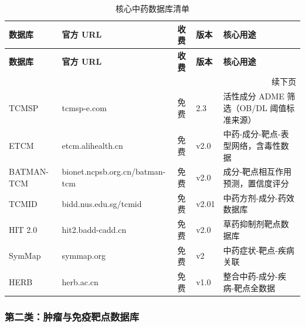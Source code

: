 \documentclass[12pt,a4paper,twoside]{article}
\begin{document}
\begin{longtable}{p{3cm}p{3.5cm}p{2cm}p{2cm}p{4cm}}
\caption{核心中药数据库清单} \label{tab:tcm_databases} \\
\toprule
\textbf{数据库} & \textbf{官方 URL} & \textbf{收费} & \textbf{版本} & \textbf{核心用途} \\
\midrule
\endfirsthead
\toprule
\textbf{数据库} & \textbf{官方 URL} & \textbf{收费} & \textbf{版本} & \textbf{核心用途} \\
\midrule
\endhead
\midrule
\multicolumn{5}{r}{\small 续下页} \\
\endfoot
\bottomrule
\endlastfoot
TCMSP & tcmsp-e.com & 免费 & 2.3 & 活性成分 ADME 筛选（OB/DL 阈值标准来源）\cite{ru2014tcmsp} \\
\addlinespace
ETCM & etcm.alihealth.cn & 免费 & v2.0 & 中药-成分-靶点-表型网络，含毒性数据 \\
\addlinespace
BATMAN-TCM & bionet.ncpsb.org.cn/batman-tcm & 免费 & v2.0 & 成分-靶点相互作用预测，置信度评分 \cite{liu2024batman} \\
\addlinespace
TCMID & bidd.nus.edu.sg/tcmid & 免费 & v2.01 & 中药方剂-成分-药效数据库 \\
\addlinespace
HIT 2.0 & hit2.badd-cadd.cn & 免费 & v2.0 & 草药抑制剂靶点数据库 \\
\addlinespace
SymMap & symmap.org & 免费 & v2 & 中药症状-靶点-疾病关联 \\
\addlinespace
HERB & herb.ac.cn & 免费 & v1.0 & 整合中药-成分-疾病-靶点全数据 \\
\end{longtable}

\subsubsection{第二类：肿瘤与免疫靶点数据库}
\end{document}
